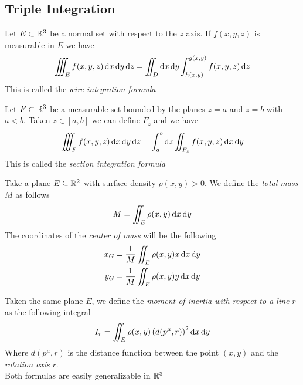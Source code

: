 \documentclass[../complete.tex]{subfiles}
\begin{document}
\subsection{Triple Integration}
\begin{thm}
	Let $E\subset\mathbb{R}^3$ be a normal set with respect to the $z$ axis. If $f(x,y,z)$ is measurable in $E$ we have
	\begin{equation}
		\iiint_Ef(x,y,z)\operatorname{d\!} x\operatorname{d\!} y\operatorname{d\!} z=\iint_D\operatorname{d\!} x\operatorname{d\!} y\int_{h(x,y)}^{g(x,y)}f(x,y,z)\operatorname{d\!} z
		\label{eq:wireint}
	\end{equation}
	This is called the \textit{wire integration formula}
\end{thm}
\begin{thm}
	Let $F\subset\mathbb{R}^3$ be a measurable set bounded by the planes $z=a$ and $z=b$ with $a<b$. Taken $z\in[a,b]$ we can define $F_z$ and we have
	\begin{equation}
		\iiint_Ff(x,y,z)\operatorname{d\!} x\operatorname{d\!} y\operatorname{d\!} z=\int_{a}^{b}\operatorname{d\!} z\iint_{F_z}f(x,y,z)\operatorname{d\!} x\operatorname{d\!} y
		\label{eq:sectionint}
	\end{equation}
	This is called the \textit{section integration formula}
\end{thm}
\begin{thm}
	Take a plane $E\subseteq\mathbb{R}^2$ with surface density $\rho(x,y)>0$. We define the \textit{total mass} $M$ as follows
	\begin{equation}
		M=\iint_E\rho(x,y)\operatorname{d\!} x\operatorname{d\!} y
		\label{eq:totmass}
	\end{equation}
	The coordinates of the \textit{center of mass} will be the following
	\begin{equation}
		\begin{aligned}
			x_G&=\frac{1}{M}\iint_E\rho(x,y)x\operatorname{d\!} x\operatorname{d\!} y\\
			y_G&=\frac{1}{M}\iint_E\rho(x,y)y\operatorname{d\!} x\operatorname{d\!} y
		\end{aligned}
		\label{eq:cmcoord}
	\end{equation}
\end{thm}
\begin{thm}
	Taken the same plane $E$, we define the \textit{moment of inertia with respect to a line} $r$ as the following integral
	\begin{equation}
		I_r=\iint_E\rho(x,y)\left( d(p^\mu,r) \right)^2\operatorname{d\!} x\operatorname{d\!} y
		\label{eq:momentinertia}
	\end{equation}
	Where $d(p^\mu,r)$ is the distance function between the point $(x,y)$ and the \textit{rotation axis} $r$.\\
	Both formulas are easily generalizable in $\mathbb{R}^3$
\end{thm}
\end{document}
